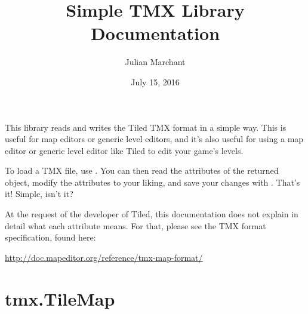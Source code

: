 \documentclass[letterpaper,10pt,english]{sphinxmanual}
\title{Simple TMX Library Documentation}
\date{July 15, 2016}
\author{Julian Marchant}
\begin{document}
\maketitle
\tableofcontents
{}\label{index::doc}

\label{index:module-tmx}
This library reads and writes the Tiled TMX format in a simple way.
This is useful for map editors or generic level editors, and it's also
useful for using a map editor or generic level editor like Tiled to edit
your game's levels.

To load a TMX file, use {\hyperref[index:tmx.TileMap.load]{\emph{}}}.  You can then read the
attributes of the returned {\hyperref[index:tmx.TileMap]{\emph{}}} object, modify the
attributes to your liking, and save your changes with
{\hyperref[index:tmx.TileMap.save]{\emph{}}}.  That's it!  Simple, isn't it?

At the request of the developer of Tiled, this documentation does not
explain in detail what each attribute means. For that, please see the
TMX format specification, found here:

\href{http://doc.mapeditor.org/reference/tmx-map-format/}{http://doc.mapeditor.org/reference/tmx-map-format/}


\chapter{tmx.TileMap}
\label{index:tmx-tilemap}\label{index:simple-tmx-library-documentation}
\end{document}
